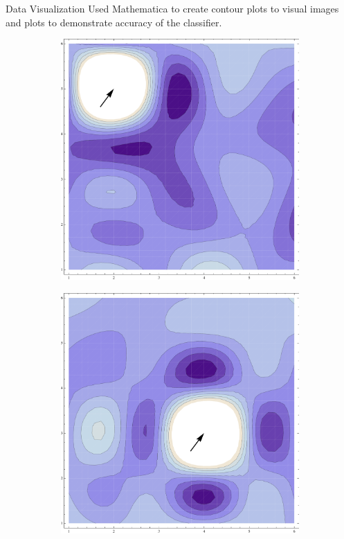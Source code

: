 \documentclass{beamer}
\begin{document}
\begin{frame}{Data Visualization}
Used Mathematica to create contour plots to visual images and plots to demonstrate accuracy of the classifier.

\begin{figure}
\centering
\begin{subfigure}{.5\textwidth}
  \centering
  \includegraphics[scale=.2]{2-5.pdf}
\end{subfigure}%
\begin{subfigure}{.5\textwidth}
  \centering
  \includegraphics[scale=.2]{4-3.pdf}
\end{subfigure}
\label{fig:test2}
\end{figure}

\end{frame}
\end{document}
